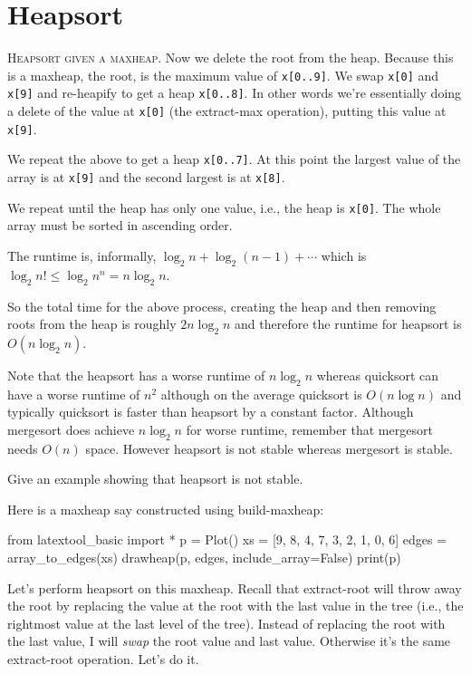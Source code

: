 
\section{Heapsort}

\textsc{Heapsort given a maxheap.}
Now we delete the root from the heap.
Because this is a maxheap, the root, is the 
maximum value of \verb!x[0..9]!.
We swap \verb!x[0]! and \verb!x[9]!
and re-heapify to get a heap \verb!x[0..8]!.
In other words we're essentially doing a delete of the value at \verb!x[0]!
(the extract-max operation), putting this value at \texttt{x[9]}.

We repeat the above to get a heap \verb!x[0..7]!.
At this point the largest value of the array is at \verb!x[9]!
and the second largest is at \verb!x[8]!.

We repeat until the heap has only one value, i.e., the heap is \verb!x[0]!.
The whole array must be sorted in ascending order.

The runtime is, informally, $\log_2 n + \log_2 (n - 1) + \cdots$
which is $\log_2 n! \leq \log_2 n^n = n \log_2 n$.

So the total time for the above process,
creating the heap and then removing roots from the 
heap is roughly $2 n \log_2 n$ and therefore
the runtime for heapsort is $O(n \log_2 n)$.

Note that the heapsort has a worse runtime of $n \log_2 n$
whereas quicksort can have a worse runtime of $n^2$
although
on the average quicksort is $O(n \log n)$ and 
typically quicksort is faster than heapsort by a constant
factor.
Although mergesort does achieve $n \log_2 n$ for worse runtime,
remember that mergesort needs $O(n)$ space.
However heapsort is not stable whereas mergesort is stable.

\begin{ex}
  Give an example showing that heapsort is not
  stable.
\end{ex}
  
  

\newpage
Here is a maxheap say constructed
using build-maxheap:

\begin{python}
from latextool_basic import *
p = Plot()
xs = [9, 8, 4, 7, 3, 2, 1, 0, 6]
edges = array_to_edges(xs)
drawheap(p, edges, include_array=False)
print(p)
\end{python}

Let's perform heapsort on this maxheap.
Recall that extract-root will throw away the root by replacing
the value at the root with the last value in the tree (i.e.,
the rightmost value at the last level of the tree).
Instead of replacing the root with the last value,
I will \textit{swap} the root value and last value.
Otherwise it's the same extract-root operation.
Let's do it.


